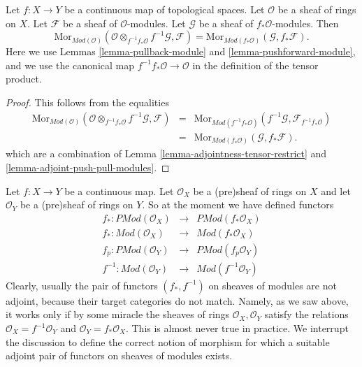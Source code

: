 \begin{lemma}
\label{lemma-adjoint-pull-push-modules}
Let $f : X \to Y$ be a continuous map of topological spaces.
Let $\mathcal{O}$ be a sheaf of rings on $X$.
Let $\mathcal{F}$ be a sheaf of $\mathcal{O}$-modules.
Let $\mathcal{G}$ be a sheaf of $f_*\mathcal{O}$-modules.
Then
$$
\text{Mor}_{\textit{Mod}(\mathcal{O})}(
\mathcal{O} \otimes_{f^{-1}f_*\mathcal{O}} f^{-1}\mathcal{G}, \mathcal{F})
=
\text{Mor}_{\textit{Mod}(f_*\mathcal{O})}(\mathcal{G}, f_*\mathcal{F}).
$$
Here we use
Lemmas \ref{lemma-pullback-module}
and \ref{lemma-pushforward-module}, and we use
the canonical map $f^{-1}f_*\mathcal{O} \to \mathcal{O}$
in the definition of the tensor product.
\end{lemma}

\begin{proof}
This follows from the equalities
\begin{eqnarray*}
\text{Mor}_{\textit{Mod}(\mathcal{O})}(
\mathcal{O} \otimes_{f^{-1}f_*\mathcal{O}} f^{-1}\mathcal{G}, \mathcal{F})
& = &
\text{Mor}_{\textit{Mod}(f^{-1}f_*\mathcal{O})}(
f^{-1}\mathcal{G}, \mathcal{F}_{f^{-1}f_*\mathcal{O}}) \\
& = &
\text{Mor}_{\textit{Mod}(f_*\mathcal{O})}(\mathcal{G}, f_*\mathcal{F}).
\end{eqnarray*}
which are a combination of
Lemma \ref{lemma-adjointness-tensor-restrict}
and \ref{lemma-adjoint-push-pull-modules}.
\end{proof}


\medskip\noindent
Let $f : X \to Y$ be a continuous map.
Let $\mathcal{O}_X$ be a (pre)sheaf of rings on $X$ and
let $\mathcal{O}_Y$ be a (pre)sheaf of rings on $Y$.
So at the moment we have defined functors
\begin{eqnarray*}
f_* : \textit{PMod}(\mathcal{O}_X) &
\longrightarrow &
\textit{PMod}(f_*\mathcal{O}_X) \\
f_* : \textit{Mod}(\mathcal{O}_X) &
\longrightarrow &
\textit{Mod}(f_*\mathcal{O}_X) \\
f_p : \textit{PMod}(\mathcal{O}_Y) &
\longrightarrow &
\textit{PMod}(f_p\mathcal{O}_Y) \\
f^{-1} : \textit{Mod}(\mathcal{O}_Y) &
\longrightarrow &
\textit{Mod}(f^{-1}\mathcal{O}_Y)
\end{eqnarray*}
Clearly, usually the pair of functors $(f_*, f^{-1})$
on sheaves of modules are not adjoint, because their target categories
do not match. Namely, as we saw above, it works only if by some miracle the
sheaves of rings $\mathcal{O}_X, \mathcal{O}_Y$ satisfy the
relations $\mathcal{O}_X = f^{-1}\mathcal{O}_Y$ and 
$\mathcal{O}_Y = f_*\mathcal{O}_X$. This is almost never
true in practice. We interrupt the discussion to define
the correct notion of morphism for which a suitable adjoint
pair of functors on sheaves of modules exists.

